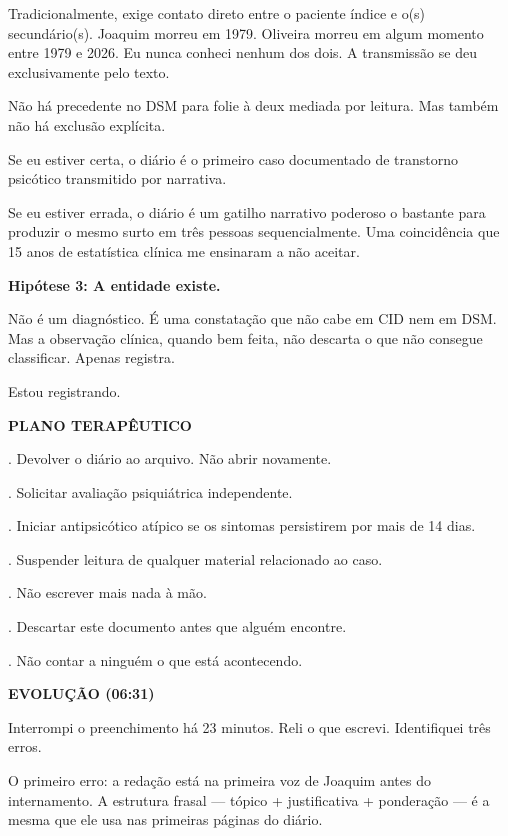 \noindent Tradicionalmente, exige contato direto entre o
\noindent paciente índice e o(s) secundário(s). Joaquim morreu em 1979.
\noindent Oliveira morreu em algum momento entre 1979 e 2026. Eu nunca
\noindent conheci nenhum dos dois. A transmissão se deu exclusivamente
\noindent pelo texto.

\noindent Não há precedente no DSM para folie à deux mediada
\noindent por leitura. Mas também não há exclusão explícita.

\noindent Se eu estiver certa, o diário é o primeiro caso
\noindent documentado de transtorno psicótico transmitido por narrativa.

\noindent Se eu estiver errada, o diário é um gatilho narrativo
\noindent poderoso o bastante para produzir o mesmo surto em três pessoas
\noindent sequencialmente. Uma coincidência que 15 anos de estatística clínica
\noindent me ensinaram a não aceitar.

\noindent \textbf{Hipótese 3: A entidade existe.}

\noindent Não é um diagnóstico. É uma constatação que não
\noindent cabe em CID nem em DSM. Mas a observação clínica, quando bem
\noindent feita, não descarta o que não consegue classificar. Apenas registra.

\noindent Estou registrando.

\noindent \textbf{PLANO TERAPÊUTICO}

. Devolver o diário ao arquivo. Não abrir novamente.

. Solicitar avaliação psiquiátrica independente.

. Iniciar antipsicótico atípico se os sintomas
\noindent persistirem por mais de 14 dias.

. Suspender leitura de qualquer material relacionado
\noindent ao caso.

. Não escrever mais nada à mão.

. Descartar este documento antes que alguém encontre.

. Não contar a ninguém o que está acontecendo.

\noindent \textbf{EVOLUÇÃO (06:31)}

\noindent Interrompi o preenchimento há 23 minutos. Reli o que escrevi.
\noindent Identifiquei três erros.

\noindent O primeiro erro: a redação está na primeira voz de Joaquim antes do
\noindent internamento. A estrutura frasal --- tópico + justificativa + ponderação ---
\noindent é a mesma que ele usa nas primeiras páginas do diário.

